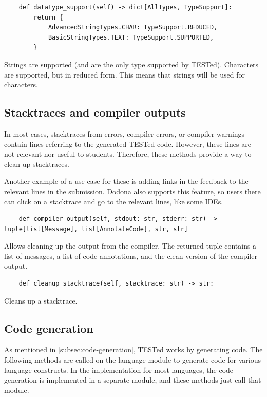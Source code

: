 \documentclass[../main]{subfiles}
\begin{document}
\begin{verbatim}
    def datatype_support(self) -> dict[AllTypes, TypeSupport]:
        return {
            AdvancedStringTypes.CHAR: TypeSupport.REDUCED,
            BasicStringTypes.TEXT: TypeSupport.SUPPORTED,
        }
\end{verbatim}

Strings are supported (and are the only type supported by TESTed).
Characters are supported, but in reduced form.
This means that strings will be used for characters.

\subsection{Stacktraces and compiler outputs}\label{subsec:error-messages-and-compiler-outputs}

In most cases, stacktraces from errors, compiler errors, or compiler warnings contain lines referring to the generated TESTed code.
However, these lines are not relevant nor useful to students.
Therefore, these methods provide a way to clean up stacktraces.

Another example of a use-case for these is adding links in the feedback to the relevant lines in the submission.
Dodona also supports this feature, so users there can click on a stacktrace and go to the relevant lines, like some IDEs.

\begin{verbatim}
    def compiler_output(self, stdout: str, stderr: str) -> tuple[list[Message], list[AnnotateCode], str, str]
\end{verbatim}

Allows cleaning up the output from the compiler.
The returned tuple contains a list of messages, a list of code annotations, and the clean version of the compiler output.

\begin{verbatim}
    def cleanup_stacktrace(self, stacktrace: str) -> str:
\end{verbatim}

Cleans up a stacktrace.

\subsection{Code generation}\label{subsec:code-generation2}

As mentioned in \cref{subsec:code-generation}, TESTed works by generating code.
The following methods are called on the language module to generate code for various language constructs.
In the implementation for most languages, the code generation is implemented in a separate module, and these methods just call that module.
\end{document}
